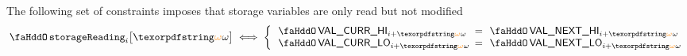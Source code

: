 The following set of constraints imposes that storage variables are only read but not modified
\[
	\storageReading
	{i}{\relof}
	\iff
	\left\{ \begin{array}{lcl}
		\stoCurrValueHi_{i + \relof} & \!\!\! = \!\!\! & \stoNextValueHi_{i + \relof} \\
		\stoCurrValueLo_{i + \relof} & \!\!\! = \!\!\! & \stoNextValueLo_{i + \relof} \\ 
	\end{array} \right.
\]
